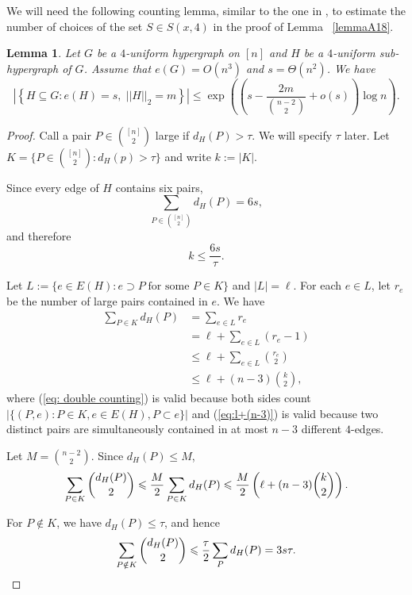 \documentclass[reqno,11pt]{amsart}
\newtheorem{lemma}[theorem]{Lemma}
\renewcommand{\leq}{\leqslant}
\begin{document}
We will need the following counting lemma, similar to the one in \cite{balogh_bollobas_morris_2009}, to estimate the number of choices of the set $S \in S(x,4)$ in the proof of Lemma ~\ref{lemmaA18}.
\begin{lemma} \label{lemma:size of clustered struture}
Let $G$ be a $4$-uniform hypergraph on $[n]$ and $H$ be a $4$-uniform sub-hypergraph of $G$. Assume that $e(G)=O(n^3)$  and $s=\Theta(n^2)$. We have 
$$ |\left\{H\subseteq G: e(H)=s,\; ||H||_2=m \right\} |
\leq \exp\left(\left( s-\frac{2m}{\binom{n-2}{2}} +o(s) \right)\log n \right).
$$
\end{lemma}
\begin{proof}
Call a pair \(P\in\binom{[n]}2\) large if $d_H(P)>\tau.$ We will specify $\tau$ later.  Let $K=\{P \in \binom{[n]}{2}: d_H(p) > \tau\}$ and write $ k:=|K|.$

Since every edge of \(H\) contains six pairs,
$$
\sum_{P\in\binom{[n]}2}d_H(P)=6s,
$$
and therefore
$$ k \leq \frac{6s}{\tau}.
$$

Let $L:=\{e \in E(H): e \supset P \; \text{for some } P \in K\}$ and $|L|=\ell$. For each $e \in L$, let $r_e$ be the number of large pairs contained in $e$. We have  
\begin{align}
\sum_{P\in K}d_H(P)&= \sum_{e \in L}r_e  \label{eq: double counting} \\
&=\ell+\sum_{e \in L}(r_e-1)\\
& \leq \ell+ \sum_{e \in L}\binom{r_e}{2}\\
&\leq \ell+(n-3)\binom{k}{2}, \label{eq:l+(n-3)}
\end{align}
where (\ref{eq: double counting}) is valid because both sides count $|\{(P,e): P \in K, e \in E(H), P \subset e \}|$ and (\ref{eq:l+(n-3)}) is valid because two distinct pairs are simultaneously contained in at most \(n-3\) different \(4\)-edges. 

Let $M=\binom{n-2}{2}.$ Since $d_H(P)\leq M$,
\begin{equation} \label{eq: p in K}
\sum_{P\in K}
\binom{d_H(P)}2
\leq
\frac{M}{2} \sum_{P\in K}d_H(P)\\
\leq
\frac{M}{2} \left(\ell+(n-3)\binom{k}{2}\right).
\end{equation}

For $P\notin K$, we have $d_H(P)\leq\tau$, and hence
\begin{equation}     \label{eq:P notin K}
\sum_{P\notin K} \binom{d_H(P)}2
\leq
\frac{\tau}{2} \sum_P d_H(P)\\
=3s\tau.
\end{equation}




\end{proof}
\end{document}
